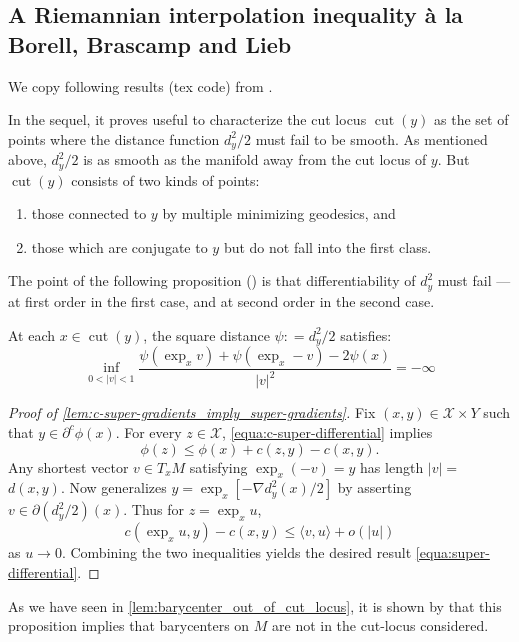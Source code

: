 \subsection{A Riemannian interpolation inequality à la Borell, Brascamp and Lieb}

We copy following results (tex code) from \cite{cordero2001riemannian}.

In the sequel, it proves useful to characterize the cut locus \( \operatorname { cut } ( y ) \) as
the set of points where the distance function \( d _ { y } ^ { 2 } / 2 \) must fail to be smooth.
As mentioned above,
\( d _ { y } ^ { 2 } / 2 \) is as smooth as the manifold away from the cut locus of \( y \).
But \( \operatorname{cut} ( y ) \) consists of two kinds of points:
\begin{enumerate}
	\item those connected to \( y \) by multiple minimizing geodesics, and
	\item	those which are conjugate to \( y \) but do not fall into the first class.
\end{enumerate}
The point of the following proposition (\cite[Proposition 2.5]{cordero2001riemannian})
is that differentiability of \( d _ { y } ^ { 2 } \) must fail --- at first order in the first case,
and at second order in the second case.

\begin{prop}
	\label{prop:distance_cut_locus}
	At each \( x \in \operatorname { cut } ( y ) \), the square distance \( \psi : = d _ { y } ^ { 2 } / 2 \) satisfies:
	\[ \inf _ { 0 < | v | < 1 } \frac { \psi \left( \exp _ { x } v \right) + \psi \left( \exp _ { x } - v \right) - 2 \psi ( x ) } { | v | ^ { 2 } } = - \infty \]
\end{prop}

\begin{proof}[Proof of \cref{lem:c-super-gradients_imply_super-gradients}]
	Fix \( ( x , y ) \in \mathcal{X} \times Y \) such that \( y \in \partial ^ { c } \phi ( x ) \).
	For every \( z \in \mathcal{X} \), \cref{equa:c-super-differential} implies
	\[ \phi ( z ) \leq \phi ( x ) + c ( z , y ) - c ( x , y ) .\]
	Any shortest vector \( v \in T _ { x } M \) satisfying \( \exp _ { x } ( - v ) = y \) has length \( | v | = \)
	\( d ( x , y )  \).
	Now  \cite[Proposition 6]{mccann2001polar} generalizes
	\( y = \exp _ { x } \left[ - \nabla d _ { y } ^ { 2 } ( x ) / 2 \right] \)
	by asserting \( v \in \partial \left( d _ { y } ^ { 2 } / 2 \right) ( x ) \).
	Thus for \( z = \exp _ { x } u \),
	\[ c \left( \exp _ { x } u , y \right) - c ( x , y ) \leq \langle v , u \rangle + o ( | u | ) \]
	as \( u \rightarrow 0 \).
	Combining the two inequalities yields the desired result \cref{equa:super-differential}.
\end{proof}
As we have seen in \cref{lem:barycenter_out_of_cut_locus},
it is shown by \cite[Lemma 3.1]{kim2015multi} that this proposition implies
that barycenters on $M$ are not in the cut-locus considered.

